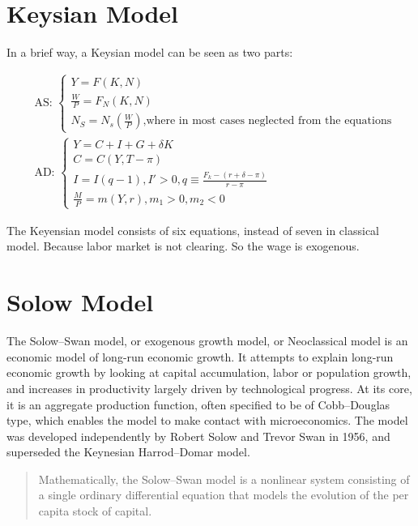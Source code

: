 \documentclass{article}
\begin{document}
\newpage
\section{Keysian Model}
In a brief way, a Keysian model can be seen as two parts:

\begin{align}
&
\text{AS: }
\begin{cases}
Y=F(K,N) \\
\frac{W}{P}=F_{N}(K,N) \\
N_{S}=N_{s}\left(\frac{W}{P}\right)\text{,where in most cases neglected from the equations}
\end{cases}
\\&\text{AD: }
\begin{cases}
Y=C+I+G+\delta K \\
C=C(Y,T-\pi) \\
I=I(q-1), I'>0, q\equiv \frac{F_{k}-(r+\delta-\pi)}{r-\pi} \\
\frac{M}{P}=m(Y,r),m_{1}>0,m_{2}<0
\end{cases}
\end{align}


The Keyensian model consists of six equations, instead of seven in
classical model. Because labor market is not clearing. So the wage is exogenous.




\newpage
\section{Solow Model}


The Solow--Swan model, or exogenous growth model, or Neoclassical model is an economic model of long-run economic growth. It attempts to explain long-run economic growth by looking at capital accumulation, labor or population growth, and increases in productivity largely driven by technological progress. At its core, it is an aggregate production function, often specified to be of Cobb--Douglas type, which enables the model to make contact with microeconomics. The model was developed independently by Robert Solow and Trevor Swan in 1956, and superseded the Keynesian Harrod--Domar model.

\begin{quote}
Mathematically, the Solow--Swan model is a nonlinear system consisting
of a single ordinary differential equation that models the evolution of
the per capita stock of capital.
\end{quote}
\end{document}

